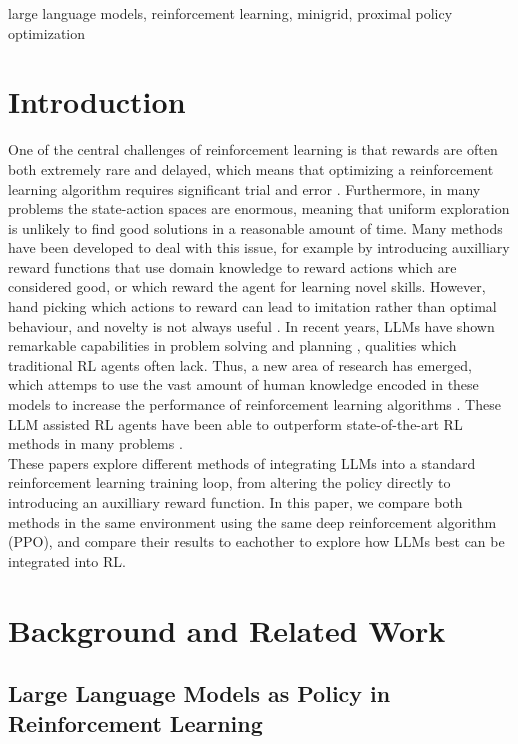 \documentclass[conference]{IEEEtran}
\begin{document}
\begin{IEEEkeywords}
large language models, reinforcement learning, minigrid, proximal policy optimization
\end{IEEEkeywords}

\section{Introduction}

One of the central challenges of reinforcement learning is that rewards are often both extremely rare and delayed, which means that optimizing a reinforcement learning algorithm requires significant trial and error \cite[423]{brunton}. Furthermore, in many problems the state-action spaces are enormous, meaning that uniform exploration is unlikely to find good solutions in a reasonable amount of time. Many methods have been developed to deal with this issue, for example by introducing auxilliary reward functions that use domain knowledge to reward actions which are considered good, or which reward the agent for learning novel skills. However, hand picking which actions to reward can lead to imitation rather than optimal behaviour, and novelty is not always useful \cite[1]{ellm}. In recent years, LLMs have shown remarkable capabilities in problem solving and planning \cite{sparks}, qualities which traditional RL agents often lack. Thus, a new area of research has emerged, which attemps to use the vast amount of human knowledge encoded in these models to increase the performance of reinforcement learning algorithms \cite{survey}. These LLM assisted RL agents have been able to outperform state-of-the-art RL methods in many problems \cite{omni} \cite{ellm} \cite{idm}.
\\

These papers explore different methods of integrating LLMs into a standard reinforcement learning training loop, from altering the policy directly to introducing an auxilliary reward function. In this paper, we compare both methods in the same environment using the same deep reinforcement algorithm (PPO), and compare their results to eachother to explore how LLMs best can be integrated into RL.




\section{Background and Related Work}

\subsection{Large Language Models as Policy in Reinforcement Learning} 
\end{document}
